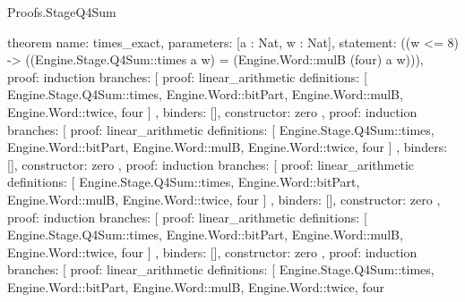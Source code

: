 \begin{lexlean}{Proofs.StageQ4Sum}
\begin{semanticmodule}
theorem{
  name: times_exact,
  parameters: [a : Nat, w : Nat],
  statement: ((w <= 8) -> ((Engine.Stage.Q4Sum::times a w) = (Engine.Word::mulB (four) a w))),
  proof: induction{
    branches: [
      {
        proof: linear_arithmetic{
          definitions: [
            Engine.Stage.Q4Sum::times,
            Engine.Word::bitPart,
            Engine.Word::mulB,
            Engine.Word::twice,
            four
          ]
        },
        binders: [],
        constructor: zero
      },
      {
        proof: induction{
          branches: [
            {
              proof: linear_arithmetic{
                definitions: [
                  Engine.Stage.Q4Sum::times,
                  Engine.Word::bitPart,
                  Engine.Word::mulB,
                  Engine.Word::twice,
                  four
                ]
              },
              binders: [],
              constructor: zero
            },
            {
              proof: induction{
                branches: [
                  {
                    proof: linear_arithmetic{
                      definitions: [
                        Engine.Stage.Q4Sum::times,
                        Engine.Word::bitPart,
                        Engine.Word::mulB,
                        Engine.Word::twice,
                        four
                      ]
                    },
                    binders: [],
                    constructor: zero
                  },
                  {
                    proof: induction{
                      branches: [
                        {
                          proof: linear_arithmetic{
                            definitions: [
                              Engine.Stage.Q4Sum::times,
                              Engine.Word::bitPart,
                              Engine.Word::mulB,
                              Engine.Word::twice,
                              four
                            ]
                          },
                          binders: [],
                          constructor: zero
                        },
                        {
                          proof: induction{
                            branches: [
                              {
                                proof: linear_arithmetic{
                                  definitions: [
                                    Engine.Stage.Q4Sum::times,
                                    Engine.Word::bitPart,
                                    Engine.Word::mulB,
                                    Engine.Word::twice,
                                    four
}}}}}}}}}}}}
\end{semanticmodule}
\end{lexlean}
